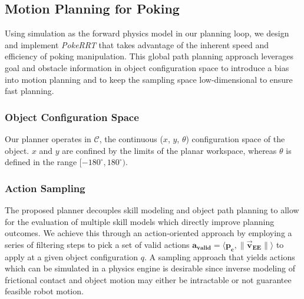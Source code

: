 \subsection{Motion Planning for Poking}\label{sec:poke-rrt}

Using simulation as the forward physics model in our planning loop, we design and implement \textsl{PokeRRT} that takes advantage of the inherent speed and efficiency of poking manipulation.
This global path planning approach leverages goal and obstacle information in object configuration space to introduce a bias into motion planning and to keep the sampling space low-dimensional to ensure fast planning.

\subsubsection{Object Configuration Space}

Our planner operates in $\mathcal{C}$, the continuous ($x$, $y$, $\theta$) configuration space of the object. $x$ and $y$ are confined by the limits of the planar workspace, whereas $\theta$ is defined in the range $[-180^\circ, 180^\circ)$.

\subsubsection{Action Sampling}\label{sec:action-sampling}

The proposed planner decouples skill modeling and object path planning to allow for the evaluation of multiple skill models which directly improve planning outcomes. We achieve this through an action-oriented approach by employing a series of filtering steps to pick a set of valid actions $\boldsymbol{a_{valid}} = \langle \boldsymbol{p_c}, \boldsymbol{\|\vec{v}_{EE}\|}\rangle$ to apply at a given object configuration $q$. A sampling approach that yields actions which can be simulated in a physics engine is desirable since inverse modeling of frictional contact and object motion may either be intractable or not guarantee feasible robot motion.

